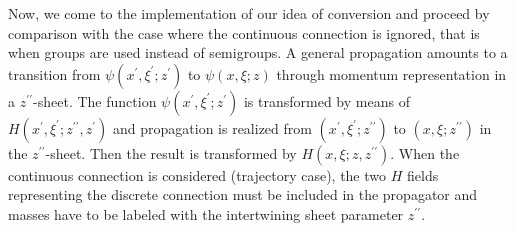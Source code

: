 \documentclass[12pt,a4paper]{article}
\begin{document}
Now, we come to the implementation of our idea of conversion and proceed by
comparison with the case where the continuous connection is ignored, that is
when groups are used instead of semigroups. A general propagation amounts to a
transition from $\psi\left(  x^{\prime},\xi^{\prime};z^{\prime}\right)  $ to
$\psi\left(  x,\xi;z\right)  $ through momentum representation in a
$z^{\prime\prime}$-sheet. \cite{Smida 2001} The function $\psi\left(
x^{\prime},\xi^{\prime};z^{\prime}\right)  $ is transformed by means of
$H\left(  x^{\prime},\xi^{\prime};z^{\prime\prime},z^{\prime}\right)  $ and
propagation is realized from $\left(  x^{\prime},\xi^{\prime};z^{\prime\prime
}\right)  $ to $\left(  x,\xi;z^{\prime\prime}\right)  $ in the $z^{\prime
\prime}$-sheet. Then the result is transformed by $H\left(  x,\xi
;z,z^{\prime\prime}\right)  $. When the continuous connection is considered
(trajectory case), the two $H$ fields representing the discrete connection
must be included in the propagator and masses have to be labeled with the
intertwining sheet parameter $z^{\prime\prime}$.
\end{document}
